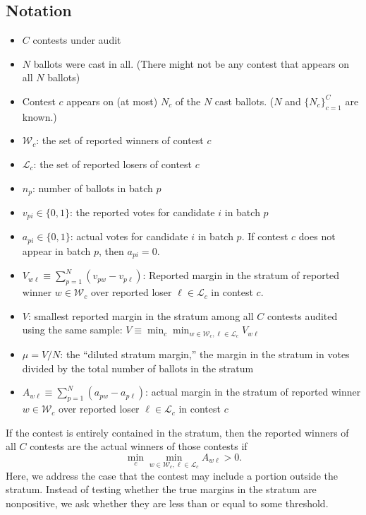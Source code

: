 \subsection{Notation}
\begin{itemize}
    \item  $C$ contests under audit
    \item  $N$ ballots were cast in all. (There might not be any contest that appears on all $N$ ballots)
    \item  Contest $c$ appears on (at most) $N_c$ of the $N$ cast ballots. ($N$ and $\{N_c\}_{c=1}^C$ are known.)
    \item  $\mathcal{W}_c$: the set of reported winners of contest $c$
    \item  $\mathcal{L}_c$: the set of reported losers of contest $c$
    \item  $n_p$: number of ballots in batch $p$
    \item  $v_{pi} \in \{0, 1\}$: the reported votes for candidate $i$ in batch $p$
    \item  $a_{pi} \in \{0, 1\}$: actual votes for candidate $i$ in batch $p$. 
                  If contest $c$ does not appear in batch $p$, then $a_{pi} = 0$.
    \item  $V_{w\ell} \equiv \sum_{p=1}^N (v_{pw} - v_{p\ell})$: 
Reported margin in the stratum of reported winner $w \in \mathcal{W}_c$ over reported loser 
$\ell \in \mathcal{L}_c$ in contest $c$.
    \item  $V$: smallest reported margin in the stratum among all $C$ contests audited using the same sample:
$V \equiv \min_c \min_{w \in \mathcal{W}_c, \ell \in \mathcal{L}_c} V_{w \ell}$
    \item  $\mu = V/N$: the ``diluted stratum margin,'' the margin in the stratum in votes divided by the total number of ballots in the stratum
    \item  $A_{w\ell} \equiv \sum_{p=1}^N (a_{pw} - a_{p\ell})$: 
actual margin in the stratum of reported winner $w \in \mathcal{W}_c$ over reported loser 
$\ell \in \mathcal{L}_c$ in contest $c$
\end{itemize}
If the contest is entirely contained in the stratum, then
the reported winners of all $C$ contests are the actual winners of those contests if
$$ 
   \min_c \min_{w \in \mathcal{W}_c, \ell \in \mathcal{L}_c} A_{w\ell} > 0.
$$
Here, we address the case that the contest may include a portion outside the stratum.
Instead of testing whether the true margins in the stratum are nonpositive, we ask whether they
are less than or equal to some threshold.

